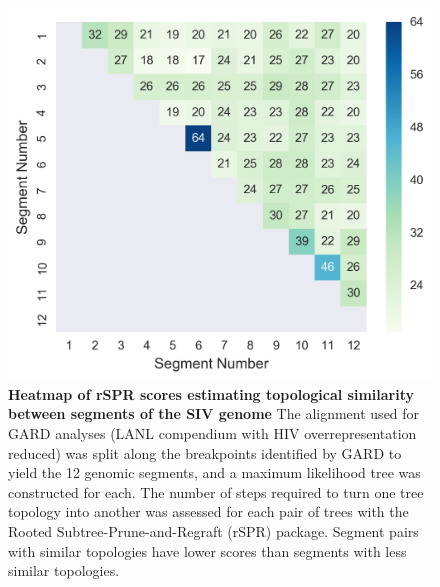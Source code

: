 \begin{figure}[ht!]
  \begin{centering}
    \includegraphics[width=.8\linewidth]{./png/siv_rspr.png}
  	\caption[Topological similarity between segments of the SIV genome]{\textbf{Heatmap of rSPR scores estimating topological similarity between segments of the SIV genome }
The alignment used for GARD analyses (LANL compendium with HIV overrepresentation reduced) was split along the breakpoints identified by GARD to yield the 12 genomic segments, and a maximum likelihood tree was constructed for each.
The number of steps required to turn one tree topology into another was assessed for each pair of trees with the Rooted Subtree-Prune-and-Regraft (rSPR) package. Segment pairs with similar topologies have lower scores than segments with less similar topologies.
        }
  	\label{siv_rspr}
  \end{centering}
\end{figure}

